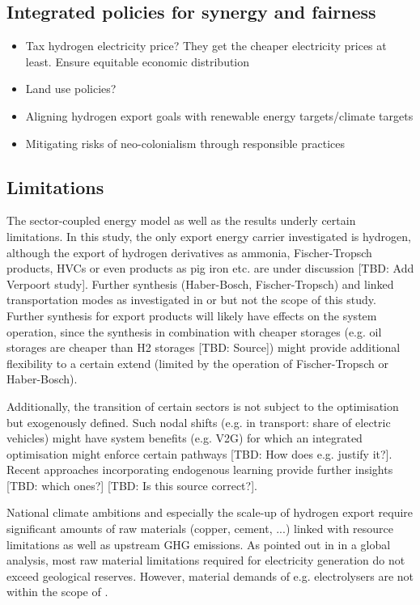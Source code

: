 \subsection{Integrated policies for synergy and fairness}
\begin{itemize}
    \item Tax hydrogen electricity price? They get the cheaper electricity prices at least. Ensure equitable economic distribution
    \item Land use policies?
    \item Aligning hydrogen export goals with renewable energy targets/climate targets 
    \item Mitigating risks of neo-colonialism through responsible practices
\end{itemize}





\subsection{Limitations}
\label{subsec:limitations}

The sector-coupled energy model as well as the results underly certain limitations. In this study, the only export energy carrier investigated is hydrogen, although the export of hydrogen derivatives as ammonia, Fischer-Tropsch products, HVCs or even products as pig iron etc. are under discussion [TBD: Add Verpoort study]. Further synthesis (Haber-Bosch, Fischer-Tropsch) and linked transportation modes as investigated in \cite{Hampp2021} or \cite{Galimova2023} but not the scope of this study. Further synthesis for export products will likely have effects on the system operation, since the synthesis in combination with cheaper storages (e.g. oil storages are cheaper than H2 storages [TBD: Source]) might provide additional flexibility to a certain extend (limited by the operation of Fischer-Tropsch or Haber-Bosch).

Additionally, the transition of certain sectors is not subject to the optimisation but exogenously defined. Such nodal shifts (e.g. in transport: share of electric vehicles) might have system benefits (e.g. V2G) for which an integrated optimisation might enforce certain pathways [TBD: How does e.g. \cite{Neumann2022} justify it?]. Recent approaches incorporating endogenous learning provide further insights [TBD: which ones?] \cite{Zeyen2023} [TBD: Is this source correct?].

National climate ambitions and especially the scale-up of hydrogen export require significant amounts of raw materials (copper, cement, ...) linked with resource limitations as well as upstream GHG emissions. As pointed out in \cite{Wang2023} in a global analysis, most raw material limitations required for electricity generation do not exceed geological reserves. However, material demands of e.g. electrolysers are not within the scope of \cite{Wang2023}.




